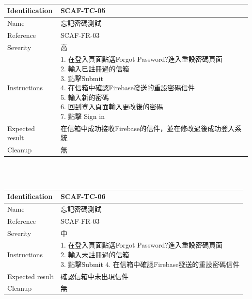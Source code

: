 \documentclass{report}
\begin{document}
\\
\begin{tabularx}{\textwidth}{
  |p{}%
  |p{}|%
  }
  \hline
  \centering Identification &  SCAF-TC-05 \\
  \hline
  \centering Name & 忘記密碼測試 \\
  \hline
  \centering Reference & SCAF-FR-03 \\
  \hline
  \centering Severity & 高 \\
  \hline
  \centering Instructions & 
  \makecell[l]{
    1. 在登入頁面點選Forgot Password?進入重設密碼頁面 \\
    2. 輸入已註冊過的信箱  \\
    3. 點擊Submit \\
    4. 在信箱中確認Firebase發送的重設密碼信件 \\
    5. 輸入新的密碼 \\
    6. 回到登入頁面輸入更改後的密碼  \\
    7. 點擊 Sign in
  }\\
  \hline
  \centering Expected result & 在信箱中成功接收Firebase的信件，並在修改過後成功登入系統 \\
  \hline
  \centering Cleanup & 無 \\
  \hline
\end{tabularx}
\\
\newline
\\
\begin{tabularx}{\textwidth}{
  |p{}%
  |p{}|%
  }
  \hline
  \centering Identification &  SCAF-TC-06 \\
  \hline
  \centering Name & 忘記密碼測試 \\
  \hline
  \centering Reference & SCAF-FR-03 \\
  \hline
  \centering Severity & 中 \\
  \hline
  \centering Instructions & 
  \makecell[l]{
    1. 在登入頁面點選Forgot Password?進入重設密碼頁面 \\
    2. 輸入未註冊過的信箱  \\
    3. 點擊Submit
    4. 在信箱中確認Firebase發送的重設密碼信件
  }\\
  \hline
  \centering Expected result & 確認信箱中未出現信件 \\
  \hline
  \centering Cleanup & 無 \\
  \hline
\end{tabularx}
\end{document}
